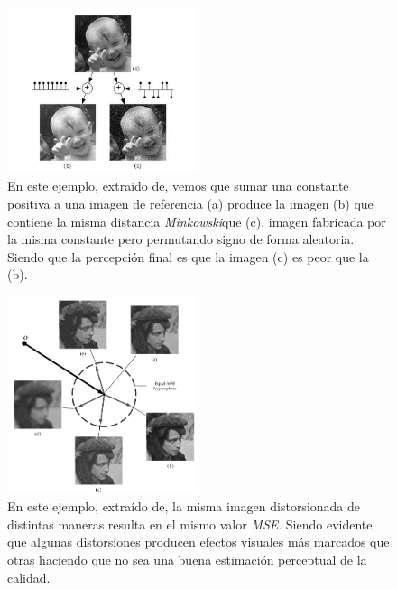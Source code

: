 \begin{figure}[htp]
  \begin{center}
    \includegraphics[width=0.5\textwidth]{imagenes/chapter1/failure_minkowski_metric.png}
  \end{center}
  \caption{En este ejemplo, extraído de\cite{MinkowskiFailure},
  vemos que sumar una constante positiva a una imagen  de referencia (a) produce la imagen (b) que contiene la misma distancia \emph{Minkowski}\footnotemark[1]
  que (c), imagen fabricada por la misma constante pero permutando signo de forma aleatoria. Siendo que
  la percepción final es que la imagen (c) es peor que la (b).
\label{fig:FailureMinkowskiMetric}}
\end{figure}
\begin{figure}[htp]
  \begin{center}
    \includegraphics[width=0.5\textwidth]{imagenes/chapter1/MSE_Hypersphere.png}
  \end{center}
  \caption{En este ejemplo, extraído de\cite{Wang2006ModernIQ}, la misma imagen distorsionada de distintas maneras
  resulta en el mismo valor \emph{MSE}. Siendo evidente que 
  algunas distorsiones producen efectos visuales más marcados que otras haciendo 
  que no sea una buena estimación perceptual de la calidad.}
  \label{fig:MSEHyperSphere}
\end{figure}

